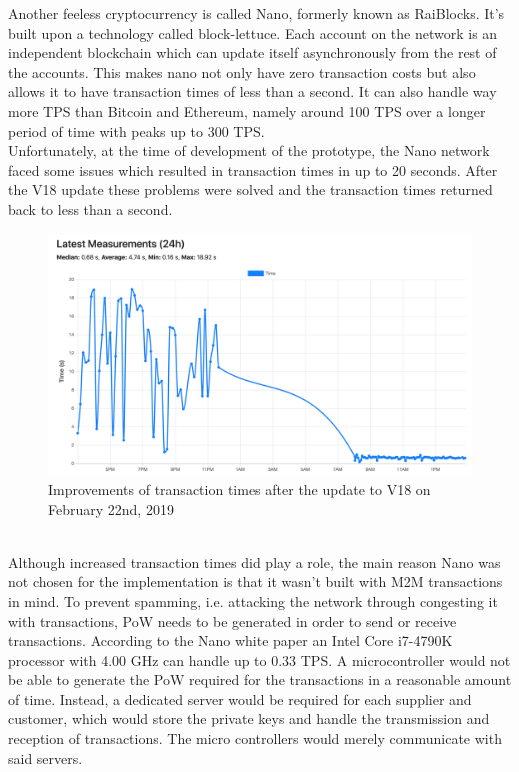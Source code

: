 Another feeless cryptocurrency is called Nano, formerly known as RaiBlocks. It's built upon a technology called block-lettuce. Each account on the network is an independent blockchain which can update itself asynchronously from the rest of the accounts. This makes nano not only have zero transaction costs but also allows it to have transaction times of less than a second. It can also handle way more TPS than Bitcoin and Ethereum, namely around 100 TPS over a longer period of time with peaks up to 300 TPS\cite{nano-stress-test}.
\\
Unfortunately, at the time of development of the prototype, the Nano network faced some issues which resulted in transaction times in up to 20 seconds. After the V18 update these problems were solved and the transaction times returned back to less than a second\cite{nano-confirmation-time}.
\\
\begin{figure}[h]
    \includegraphics[width=\textwidth]{img/nano-confirmation-time.pdf}
    \caption{Improvements of transaction times after the update to V18 on February 22nd, 2019}
    \label{fig:NanoConfirmationTime}
\end{figure}
\\
Although increased transaction times did play a role, the main reason Nano was not chosen for the implementation is that it wasn't built with M2M transactions in mind. To prevent spamming, i.e. attacking the network through congesting it with transactions, PoW needs to be generated in order to send or receive transactions. According to the Nano white paper\cite{nano-white-paper} an Intel Core i7-4790K processor with 4.00 GHz can handle up to 0.33 TPS. A microcontroller would not be able to generate the PoW required for the transactions in a reasonable amount of time. Instead, a dedicated server would be required for each supplier and customer, which would store the private keys and handle the transmission and reception of transactions. The micro controllers would merely communicate with said servers.
